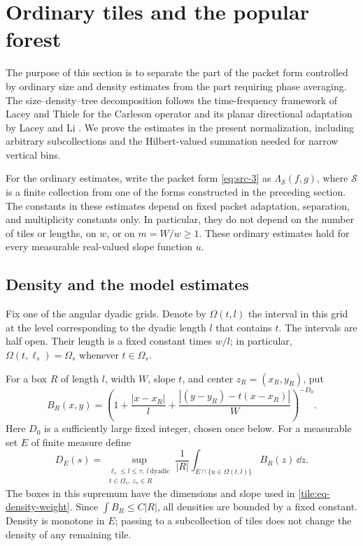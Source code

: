 \section{Ordinary tiles and the popular forest}\label{tile:section}

The purpose of this section is to separate the part of the packet
form controlled by ordinary size and density estimates from the part
requiring phase averaging. The size--density--tree decomposition follows the time-frequency
framework of Lacey and Thiele for the Carleson operator
\cite{LaceyThiele2000} and its planar directional adaptation by
Lacey and Li \cite{LLAnnular,LLStein}. We prove the
estimates in the present normalization, including arbitrary subcollections
and the Hilbert-valued summation needed for narrow vertical bins.

For the ordinary estimates, write the packet form \eqref{eq:src-3} as
\(\Lambda_{\mathcal S}(f,g)\), where \(\mathcal S\) is a finite
collection from one of the forms constructed in the preceding section.
The constants in these estimates depend on fixed packet adaptation,
separation, and multiplicity constants only.  In particular, they do
not depend on the number of tiles or lengths, on \(w\), or on
\(m=W/w\geq1\).  These ordinary estimates hold for every measurable
real-valued slope function \(u\).

\subsection{Density and the model estimates}

Fix one of the angular dyadic grids.  Denote by \(\Omega(t,l)\)
the interval in this grid at the level corresponding to the dyadic
length \(l\) that contains \(t\).  The intervals are half open.  Their
length is a fixed constant times \(w/l\); in particular,
\(\Omega(t,\ell_s)=\Omega_s\) whenever \(t\in\Omega_s\).

For a box \(R\) of length \(l\), width \(W\), slope \(t\), and center
\(z_R=(x_R,y_R)\), put
\begin{equation}\label{tile:eq-density-weight}
 B_R(x,y)=
 \left(1+\frac{|x-x_R|}{l}
 +\frac{|(y-y_R)-t(x-x_R)|}{W}\right)^{-D_0}.
\end{equation}
Here \(D_0\) is a sufficiently large fixed integer, chosen once below.
For a measurable set \(E\) of finite measure define
\begin{equation}\label{tile:eq-density}
 D_E(s)=
 \sup_{\substack{\ell_s\leq l\leq\tau,\ l\ \text{dyadic}\\
                   t\in\Omega_s,\ z_s\in R}}
 \frac{1}{|R|}
 \int_{E\cap\{u\in\Omega(t,l)\}} B_R(z)\,\dd z.
\end{equation}
The boxes in this supremum have the dimensions and slope used in
\eqref{tile:eq-density-weight}.  Since \(\int B_R\leq C|R|\), all
densities are bounded by a fixed constant.  Density is monotone in
\(E\); passing to a subcollection of tiles does not change the density
of any remaining tile.


